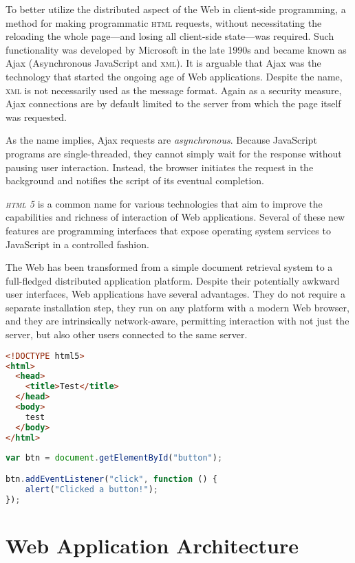 To better utilize the distributed aspect of the Web in client-side programming, a method for making programmatic \textsc{html} requests, without necessitating the reloading the whole page---and losing all client-side state---was required. Such functionality was developed by Microsoft in the late 1990s and became known as Ajax (Asynchronous JavaScript and \textsc{xml}). It is arguable that Ajax was the technology that started the ongoing age of Web applications. Despite the name, \textsc{xml} is not necessarily used as the message format. Again as a security measure, Ajax connections are by default limited to the server from which the page itself was requested.

As the name implies, Ajax requests are \emph{asynchronous}. Because JavaScript programs are single-threaded, they cannot simply wait for the response without pausing user interaction. Instead, the browser initiates the request in the background and notifies the script of its eventual completion.

\emph{\textsc{html} 5} is a common name for various technologies that aim to improve the capabilities and richness of interaction of Web applications. Several of these new features are programming interfaces that expose operating system services to JavaScript in a controlled fashion.

The Web has been transformed from a simple document retrieval system to a full-fledged distributed application platform. Despite their potentially awkward user interfaces, Web applications have several advantages. They do not require a separate installation step, they run on any platform with a modern Web browser, and they are intrinsically network-aware, permitting interaction with not just the server, but also other users connected to the same server.



\begin{lstlisting}[language=HTML]
<!DOCTYPE html5>
<html>
  <head>
    <title>Test</title>
  </head>
  <body>
    test
  </body>
</html>
\end{lstlisting}

\begin{lstlisting}[language=JavaScript]
var btn = document.getElementById("button");

btn.addEventListener("click", function () {
    alert("Clicked a button!");
});
\end{lstlisting}

\section{Web Application Architecture}

